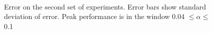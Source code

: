 \documentclass[a4paper,11pt]{article}
\begin{document}
\begin{center}
\begin{figure}
\\
\caption{Error on the second set of experiments. Error bars show
standard deviation of error. Peak performance is in the window 0.04
$\leq\alpha\leq$ 0.1}
\label{fig:fineerror}
\end{figure}
\end{center}
\end{document}
